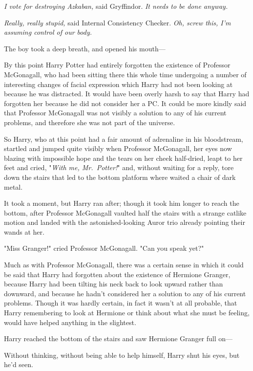 \emph{I vote for destroying Azkaban,} said Gryffindor. \emph{It needs to be 
done anyway.}

\emph{Really, really stupid,} said Internal Consistency Checker. \emph{Oh, 
screw this, I'm assuming control of our body.}

The boy took a deep breath, and opened his mouth---

By this point Harry Potter had entirely forgotten the existence of Professor 
McGonagall, who had been sitting there this whole time undergoing a number of 
interesting changes of facial expression which Harry had not been looking at 
because he was distracted. It would have been overly harsh to say that Harry 
had forgotten her because he did not consider her a PC. It could be more kindly 
said that Professor McGonagall was not visibly a solution to any of his current 
problems, and therefore she was not part of the universe.

So Harry, who at this point had a fair amount of adrenaline in his bloodstream, 
startled and jumped quite visibly when Professor McGonagall, her eyes now 
blazing with impossible hope and the tears on her cheek half-dried, leapt to 
her feet and cried, "\emph{With me, Mr.~Potter!}" and, without waiting for a 
reply, tore down the stairs that led to the bottom platform where waited a 
chair of dark metal.

It took a moment, but Harry ran after; though it took him longer to reach the 
bottom, after Professor McGonagall vaulted half the stairs with a strange 
catlike motion and landed with the astonished-looking Auror trio already 
pointing their wands at her.

"Miss Granger!" cried Professor McGonagall. "Can you speak yet?"

Much as with Professor McGonagall, there was a certain sense in which it could 
be said that Harry had forgotten about the existence of Hermione Granger, 
because Harry had been tilting his neck back to look upward rather than 
downward, and because he hadn't considered her a solution to any of his current 
problems. Though it was hardly certain, in fact it wasn't at all probable, that 
Harry remembering to look at Hermione or think about what she must be feeling, 
would have helped anything in the slightest.

Harry reached the bottom of the stairs and saw Hermione Granger full on---

Without thinking, without being able to help himself, Harry shut his eyes, but 
he'd seen.

